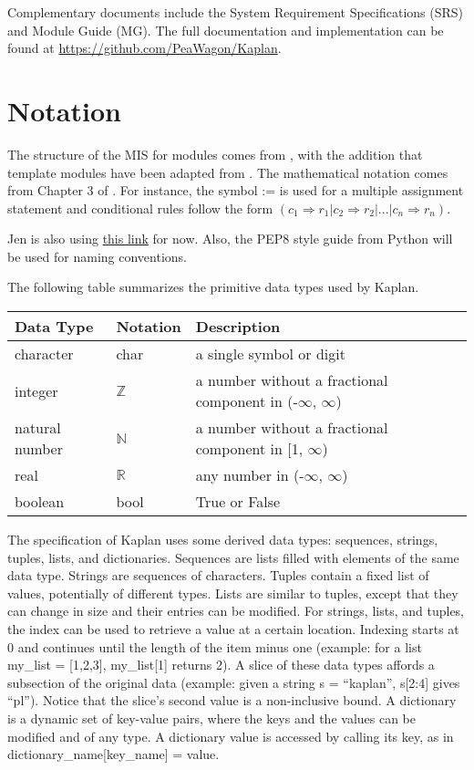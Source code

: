 \documentclass[12pt, titlepage]{article}
\newcommand{\progname}{Kaplan}
\begin{document}
Complementary documents include the System Requirement Specifications (SRS)
and Module Guide (MG).  The full documentation and implementation can be
found at \url{https://github.com/PeaWagon/Kaplan}.

\section{Notation}

The structure of the MIS for modules comes from \citet{HoffmanAndStrooper1995},
with the addition that template modules have been adapted from
\cite{GhezziEtAl2003}.  The mathematical notation comes from Chapter 3 of
\citet{HoffmanAndStrooper1995}.  For instance, the symbol := is used for a
multiple assignment statement and conditional rules follow the form $(c_1
\Rightarrow r_1 | c_2 \Rightarrow r_2 | ... | c_n \Rightarrow r_n )$.

Jen is also using \href{https://proofwiki.org/wiki/Symbols:R}{this link} for 
now. Also, the PEP8 style guide from Python will be used for naming conventions.

The following table summarizes the primitive data types used by \progname. 

\begin{center}
\renewcommand{\arraystretch}{1.2}
\noindent 
\begin{tabular}{l l p{7.5cm}} 
\toprule 
\textbf{Data Type} & \textbf{Notation} & \textbf{Description}\\ 
\midrule
character & char & a single symbol or digit\\
integer & $\mathbb{Z}$ & a number without a fractional component in (-$\infty$, $\infty$) \\
natural number & $\mathbb{N}$ & a number without a fractional component in [1, $\infty$) \\
real & $\mathbb{R}$ & any number in (-$\infty$, $\infty$)\\
boolean & bool & True or False \\


\bottomrule
\end{tabular} 
\end{center}

\noindent
The specification of \progname{} uses some derived data types: sequences, 
strings, tuples, lists, and dictionaries. Sequences are lists filled with 
elements of the same data type. Strings
are sequences of characters. Tuples contain a fixed list of values, potentially 
of different types. Lists are similar to tuples, except that they can change in 
size and their entries can be modified. For strings, lists, and tuples, the 
index can be used to retrieve a value at a certain location. Indexing starts at 
0 and continues until the length of the item minus one (example: for a list 
my\_list = [1,2,3], my\_list[1] returns 2). A slice of these data types affords 
a subsection of the original data (example: given a string s = ``kaplan'', 
s[2:4] gives ``pl''). Notice that the slice's second value is a non-inclusive 
bound. A dictionary is a dynamic set of key-value pairs, where the keys and the 
values can be modified and of any type. A dictionary value is accessed by 
calling its key, as in dictionary\_name[key\_name] = value.
\end{document}
